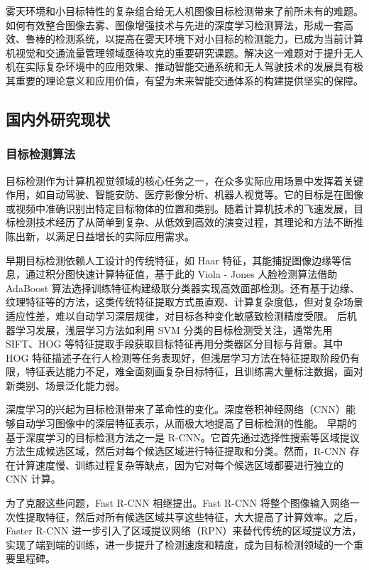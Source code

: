 雾天环境和小目标特性的复杂组合给无人机图像目标检测带来了前所未有的难题。如何有效整合图像去雾、图像增强技术与先进的深度学习检测算法，形成一套高效、鲁棒的检测系统，以提高在雾天环境下对小目标的检测能力，已成为当前计算机视觉和交通流量管理领域亟待攻克的重要研究课题。解决这一难题对于提升无人机在实际复杂环境中的应用效果、推动智能交通系统和无人驾驶技术的发展具有极其重要的理论意义和应用价值，有望为未来智能交通体系的构建提供坚实的保障。


\subsection{国内外研究现状}

\subsubsection{目标检测算法}

目标检测作为计算机视觉领域的核心任务之一，在众多实际应用场景中发挥着关键作用，如自动驾驶、智能安防、医疗影像分析、机器人视觉等。它的目标是在图像或视频中准确识别出特定目标物体的位置和类别。随着计算机技术的飞速发展，目标检测技术经历了从简单到复杂、从低效到高效的演变过程，其理论和方法不断推陈出新，以满足日益增长的实际应用需求。

早期目标检测依赖人工设计的传统特征，如 Haar \cite{Haar_like} 特征，其能捕捉图像边缘等信息，通过积分图快速计算特征值，基于此的 Viola - Jones 人脸检测算法借助 AdaBoost 算法选择训练特征构建级联分类器实现高效面部检测。还有基于边缘、纹理特征等的方法，这类传统特征提取方式虽直观、计算复杂度低，但对复杂场景适应性差，难以自动学习深层规律，对目标各种变化敏感致检测精度受限。
后机器学习发展，浅层学习方法如利用 SVM 分类的目标检测受关注\cite{svm}，通常先用 SIFT、HOG 等特征提取手段获取目标特征再用分类器区分目标与背景。其中 HOG 特征描述子在行人检测等任务表现好，但浅层学习方法在特征提取阶段仍有限，特征表达能力不足，难全面刻画复杂目标特征，且训练需大量标注数据，面对新类别、场景泛化能力弱。

深度学习的兴起为目标检测带来了革命性的变化。深度卷积神经网络（CNN）\cite{cnn}能够自动学习图像中的深层特征表示，从而极大地提高了目标检测的性能。
早期的基于深度学习的目标检测方法之一是 R-CNN\cite{fast_rcnn,mask_rcnn}。它首先通过选择性搜索等区域提议方法生成候选区域，然后对每个候选区域进行特征提取和分类。然而，R-CNN 存在计算速度慢、训练过程复杂等缺点，因为它对每个候选区域都要进行独立的 CNN 计算。

为了克服这些问题，Fast R-CNN 相继提出。Fast R-CNN 将整个图像输入网络一次性提取特征，然后对所有候选区域共享这些特征，大大提高了计算效率。之后，Faster R-CNN 进一步引入了区域提议网络（RPN）来替代传统的区域提议方法，实现了端到端的训练，进一步提升了检测速度和精度，成为目标检测领域的一个重要里程碑。

